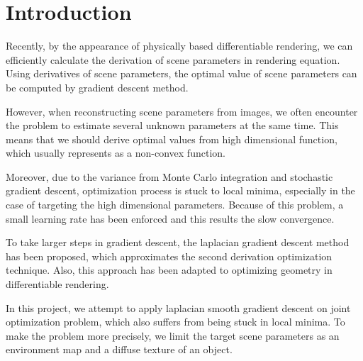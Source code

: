 \section*{Introduction}\label{ch:ch1label}

Recently, by the appearance of physically based differentiable rendering, we can efficiently calculate the derivation of scene parameters in rendering equation. Using derivatives of scene parameters, the optimal value of scene parameters can be computed by gradient descent method. 

However, when reconstructing scene parameters from images, we often encounter the problem to estimate several unknown parameters at the same time. This means that we should derive optimal values from high dimensional function, which usually represents as a non-convex function.

Moreover, due to the variance from Monte Carlo integration and stochastic gradient descent, optimization process is stuck to local minima, especially in the case of targeting the high dimensional parameters. Because of this problem, a small learning rate has been enforced and this results the slow convergence.

To take larger steps in gradient descent, the laplacian gradient descent method has been proposed, which approximates the second derivation optimization technique\cite{osher2018laplacian}.
Also, this approach has been adapted to optimizing geometry in differentiable rendering\cite{Nicolet2021Large}.

In this project, we attempt to apply laplacian smooth gradient descent on joint optimization problem, which also suffers from being stuck in local minima. To make the problem more precisely, we limit the target scene parameters as an environment map and a diffuse texture of an object.